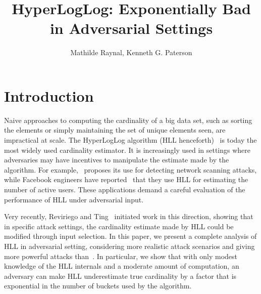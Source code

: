 \documentclass{IEEEtran}
\title{HyperLogLog: Exponentially Bad in Adversarial Settings}
\author{Mathilde Raynal, Kenneth G. Paterson}
\begin{document}
\maketitle


\IEEEdisplaynontitleabstractindextext

\section{Introduction}
Naive approaches to computing the cardinality of a big data set, such as sorting the elements or simply maintaining the set of unique elements seen, are impractical at scale. The HyperLogLog algorithm (HLL henceforth)~\cite{hll} is today the most widely used cardinality estimator. It is increasingly used in settings where adversaries may have  incentives to manipulate the estimate made by the algorithm. For example,~\cite{portscanhll} proposes its use for detecting network scanning attacks, while Facebook engineers have reported~\cite{fbhll} that they use HLL for estimating the number of active users. These applications demand a careful evaluation of the performance of HLL under adversarial input.

Very recently, Reviriego and Ting~\cite{hllvuln} initiated work in this direction, showing that in specific attack settings, the cardinality estimate made by HLL could be modified through input selection. In this paper, we present a complete analysis of HLL in adversarial setting, considering more realistic attack scenarios and giving more powerful attacks than~\cite{hllvuln}. In particular, we show that with only modest knowledge of the HLL internals and a moderate amount of computation, an adversary can make HLL underestimate true cardinality by a factor that is exponential in the number of buckets used by the algorithm.
\end{document}
